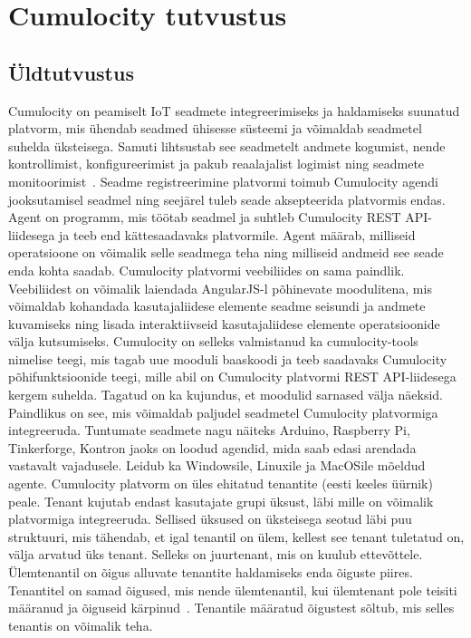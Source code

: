 \documentclass[12pt]{article}
\newcommand{\newlinespacer}{{%
    \newline
    \newline
  }}%
\begin{document}
  
  
  
  
  \newpage
  \section{Cumulocity tutvustus} 
  
  
  \subsection{Üldtutvustus}
  
  Cumulocity on peamiselt IoT seadmete integreerimiseks ja haldamiseks
  suunatud platvorm, mis ühendab seadmed ühisesse süsteemi
  ja võimaldab seadmetel suhelda üksteisega. Samuti lihtsustab see seadmetelt andmete kogumist,
  nende kontrollimist, konfigureerimist ja pakub
  reaalajalist logimist ning seadmete monitoorimist~\cite{CumulocityConceptsInterfaceingDevices,
  CumulocityConceptsDomainModel}.
  Seadme registreerimine platvormi toimub Cumulocity
  agendi jooksutamisel seadmel ning seejärel tuleb seade aksepteerida platvormis endas. Agent on
  programm, mis töötab seadmel ja suhtleb Cumulocity REST API-liidesega ja teeb end kättesaadavaks
  platvormile.
  Agent määrab, milliseid operatsioone on võimalik selle seadmega teha ning milliseid andmeid see
  seade enda kohta saadab.
  \newlinespacer
  Cumulocity platvormi veebiliides on sama paindlik. Veebiliidest on võimalik laiendada AngularJS-l
  põhinevate moodulitena, mis võimaldab kohandada kasutajaliidese elemente seadme seisundi ja
  andmete kuvamiseks ning lisada interaktiivseid kasutajaliidese elemente operatsioonide välja
  kutsumiseks.
  Cumulocity on selleks valmistanud ka cumulocity-tools nimelise teegi,
  mis tagab uue mooduli baaskoodi ja teeb saadavaks Cumulocity põhifunktsioonide teegi, mille abil
  on Cumulocity platvormi REST API-liidesega kergem suhelda. Tagatud on ka kujundus, et moodulid
  sarnased välja näeksid.
  \newlinespacer
  Paindlikus on see, mis võimaldab paljudel seadmetel Cumulocity platvormiga integreeruda. Tuntumate
  seadmete nagu näiteks Arduino, Raspberry Pi, Tinkerforge, Kontron jaoks on loodud agendid, mida
  saab edasi arendada vastavalt vajadusele. Leidub ka Windowsile, Linuxile ja MacOSile mõeldud agente.
  \newlinespacer
  Cumulocity platvorm on üles ehitatud tenantite (eesti keeles üürnik) peale.
  Tenant kujutab endast kasutajate grupi üksust, läbi mille on võimalik platvormiga integreeruda.
  Sellised üksused on üksteisega seotud läbi puu struktuuri, mis tähendab, et
  igal tenantil on ülem, kellest see tenant tuletatud on, välja arvatud üks tenant.
  Selleks on juurtenant, mis on kuulub ettevõttele. Ülemtenantil on õigus alluvate
  tenantite haldamiseks enda õiguste piires. Tenantitel on samad õigused,
  mis nende ülemtenantil, kui ülemtenant pole teisiti määranud ja õiguseid
  kärpinud~\cite{CumulocityUsersGuideAdministration}.
  Tenantile määratud õigustest sõltub, mis selles tenantis on võimalik teha.
\end{document}

